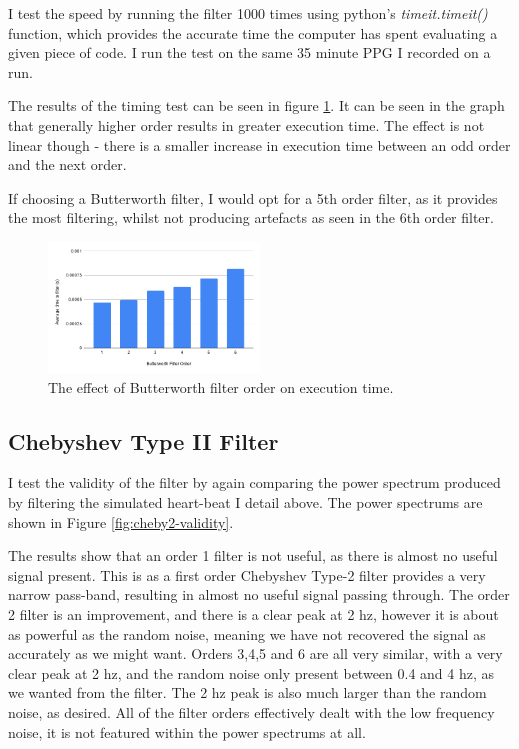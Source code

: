 \documentclass[12pt,a4paper,twoside,openright]{report}
\begin{document}
I test the speed by running the filter 1000 times using python's
\emph{timeit.timeit()} function, which provides the accurate time the computer
has spent evaluating a given piece of code. I run the test on the same 35
minute PPG I recorded on a run. 

The results of the timing test can be seen in figure \ref{fig:butter-time}. It
can be seen in the graph that generally higher order results in greater
execution time. The effect is not linear though - there is a smaller increase
in execution time 
between an odd order and the next order. 

If choosing a Butterworth filter, I would opt for a 5th order filter, as it
provides the most filtering, whilst not producing artefacts as seen in the 6th
order filter. 

\begin{figure}[tbh]
	\centerline{\includegraphics[width=0.5\textwidth]{figs/butter-time.png}}
	\caption{The effect of Butterworth filter order on execution time.}
	\label{fig:butter-time}
\end{figure}

\subsection{Chebyshev Type II Filter}

I test the validity of the filter by again comparing the power spectrum produced by
filtering the simulated heart-beat I detail above. The power spectrums are
shown in Figure 
\ref{fig:cheby2-validity}. 

The results show that an order 1 filter is not useful, as there is almost no
useful signal present. This is as a first order Chebyshev Type-2 filter
provides a very narrow pass-band, resulting in almost no useful signal passing
through. The order 2 filter is an improvement, and there is a
clear peak at 2 hz, however it is about as powerful as the random noise,
meaning we have not recovered the signal as accurately as we might want. 
Orders 3,4,5 and 6 are all very
similar, with a very clear peak at 2 hz, and the random noise only present
between 0.4 and 4 hz, as we wanted from the filter. The 2 hz peak is also much
larger than the random noise, as desired. All of the filter orders effectively
dealt with the low frequency noise, it is not featured within the power
spectrums at all.
\end{document}
